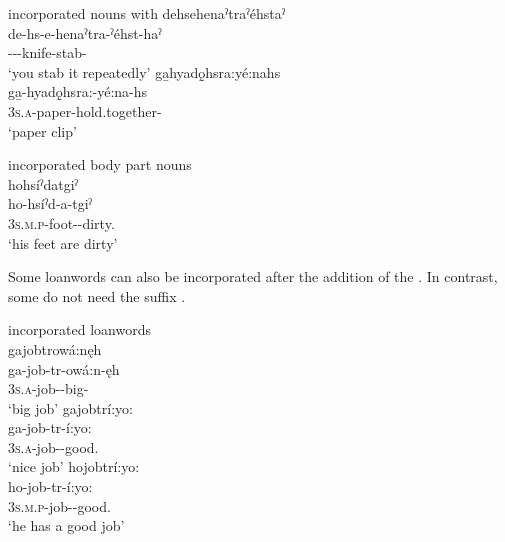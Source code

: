 \newpage
\ea\label{ex:nounincex5} incorporated nouns with  {\nominalizer}
\ea dehsehenaˀtraˀéhstaˀ\\
\gll de-hs-e-henaˀtra-ˀéhst-haˀ\\
 {\dualic}--{\joinerE}-knife-stab-{\habitual}\\
\glt `you stab it repeatedly'
\ex ga̱hyadǫ̱hsra:yé:nahs\\
\gll ga̱-hyadǫ̱hsra:-yé:na-hs\\
 \textsc{3s.a}-paper-hold.together-{\habitual}\\
\glt `paper clip'

\z
\z

\ea\label{ex:nounincex6} incorporated body part nouns\\
hohsíˀdatgiˀ\\
\gll ho-hsíˀd-a-tgiˀ\\
 \textsc{3s.m.p}-foot-{\joinerA}-dirty.{\stative}\\
\glt `his feet are dirty'
\z


Some loanwords can also be incorporated after the addition of the  \textsc{\nominalizer} . In contrast, some do not need the suffix .

\ea\label{ex:nounincex301} incorporated loanwords\\
\ea gajobtrowá:nęh\\
\gll ga-job-tr-owá:n-ęh\\
 \textsc{3s.a}-job-{\nominalizer}-big-{\stative}\\
\glt `big job'
\ex gajobtrí:yo:\\
\gll ga-job-tr-í:yo:\\
 \textsc{3s.a}-job-{\nominalizer}-good.{\stative}\\
\glt `nice job'
\ex hojobtrí:yo:\\
\gll ho-job-tr-í:yo:\\
\textsc{3s.m.p}-job-{\nominalizer}-good.{\stative}\\
\glt ‘he has a good job’
\z
\z

